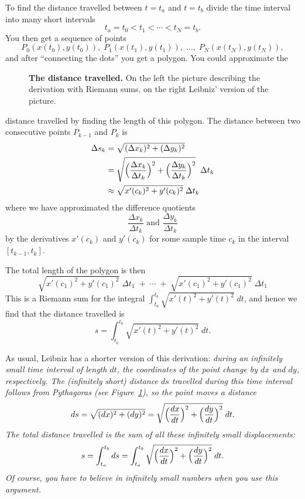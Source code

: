 To find the distance travelled between $t=t_a$ and $t=t_b$ divide the time
interval into many short intervals
\[
t_a=t_0<t_1<\cdots<t_N=t_b.
\]
You then get a sequence of points
\[
P_0(x(t_0), y(t_0)),\; P_1(x(t_1), y(t_1)),\; \ldots,\; P_N(x(t_N), y(t_N)),
\]
and after ``connecting the dots'' you get a polygon.  You could approximate the
\begin{figure}[ht]
  \centering
  \parbox{178pt}{{}}
  \parbox{178pt}{{}}
  \caption{\textbf{The distance travelled. } On the left the picture describing
    the derivation with Riemann sums, on the right Leibniz' version of the
    picture.}
  \label{fig:09arclength}
\end{figure}
distance travelled by finding the length of this polygon.  The distance between
two consecutive points $P_{k-1}$ and $P_k$ is
\begin{align*}
  \Delta s_k
  &= \sqrt{(\Delta x_k)^2 + (\Delta y_k)^2}\\
  &= \sqrt{\Bigl(\frac{\Delta x_k}{\Delta t_k}\Bigr)^2 + \Bigl(\frac{\Delta
      y_k}{\Delta t_k}\Bigr)^2}
  \;\; \Delta t_k\\
  &\approx \sqrt{x'(c_k)^2 + y'(c_k)^2}\; \Delta t_k
\end{align*}
where we have approximated the difference quotients
\[
\frac{\Delta x_k}{\Delta t_k} \text{ and } \frac{\Delta y_k}{\Delta t_k}
\]
by the derivatives $x'(c_k)$ and $y'(c_k)$ for some sample time $c_k$ in the
interval $[t_{k-1}, t_k]$.

The total length of the polygon is then
\[
\sqrt{x'(c_1)^2 + y'(c_1)^2}\; \Delta t_1 \; +\; \cdots \; + \; \sqrt{x'(c_1)^2
  + y'(c_1)^2}\; \Delta t_1
\]
This is a Riemann sum for the integral $\int_{t_a}^{t_b} \sqrt{x'(t)^2 +
  y'(t)^2} \;dt$, and hence we find that the distance travelled is
\begin{equation}
  s=\int_{t_a}^{t_b} \sqrt{x'(t)^2 + y'(t)^2} \;dt.
  \label{eq:09distance-travelled}
\end{equation}

As usual, Leibniz has a shorter version of this derivation: \itshape%
during an infinitely small time interval of length $dt$, the coordinates of the
point change by $dx$ and $dy$, respectively.  The (infinitely short) distance
$ds$ travelled during this time interval follows from Pythagoras (see
Figure~\ref{fig:09arclength}), so the point moves a distance
\[
ds = \sqrt{(dx)^2 + (dy)^2} = \sqrt{\Bigl(\frac{dx}{dt}\Bigr)^2 +
  \Bigl(\frac{dy}{dt}\Bigr)^2} \; dt.
\]
The total distance travelled is the sum of all these infinitely small
displacements:
\[
s= \int_{t_a}^{t_b} ds = \int_{t_a}^{t_b} \sqrt{\Bigl(\frac{dx}{dt}\Bigr)^2 +
  \Bigl(\frac{dy}{dt}\Bigr)^2} \; dt.
\]%
\upshape%
Of course, you have to believe in infinitely small numbers when you use this
argument.

